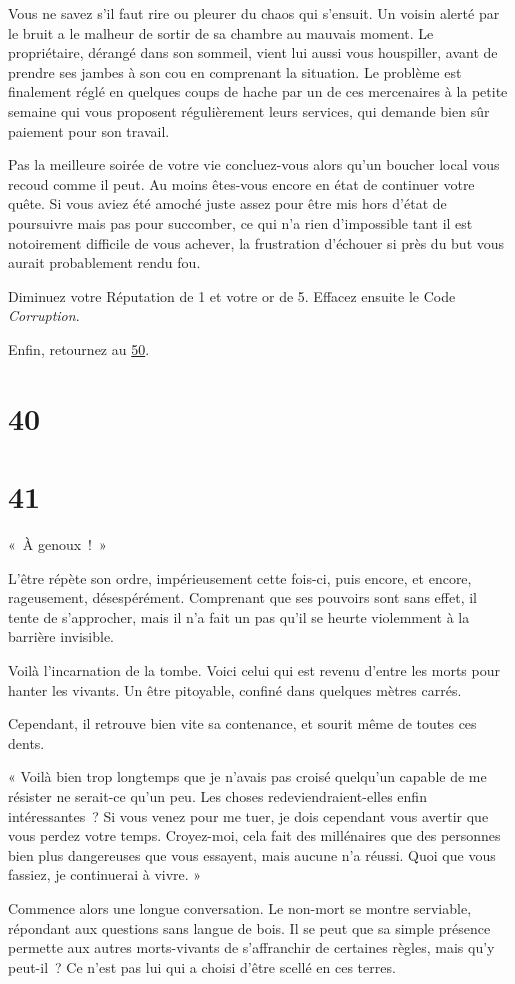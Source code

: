 \documentclass{report}
\newcommand{\gsection}[1]{
    \section{#1}
    \label{section-#1}
}
\newcommand{\glink}[1]{\hyperref[section-#1]{#1}}
\begin{document}
Vous ne savez s'il faut rire ou pleurer du chaos qui s'ensuit. Un voisin alerté par le bruit a le malheur de sortir de sa chambre au mauvais moment. Le propriétaire, dérangé dans son sommeil, vient lui aussi vous houspiller, avant de prendre ses jambes à son cou en comprenant la situation. Le problème est finalement réglé en quelques coups de hache par un de ces mercenaires à la petite semaine qui vous proposent régulièrement leurs services, qui demande bien sûr paiement pour son travail.

Pas la meilleure soirée de votre vie concluez-vous alors qu'un boucher local vous recoud comme il peut. Au moins êtes-vous encore en état de continuer votre quête. Si vous aviez été amoché juste assez pour être mis hors d'état de poursuivre mais pas pour succomber, ce qui n'a rien d'impossible tant il est notoirement difficile de vous achever, la frustration d'échouer si près du but vous aurait probablement rendu fou.

Diminuez votre Réputation de 1 et votre or de 5. Effacez ensuite le Code \emph{Corruption}.

Enfin, retournez au \glink{50}.

\gsection{40}

\gsection{41}

« À genoux ! »

L'être répète son ordre, impérieusement cette fois-ci, puis encore, et encore, rageusement, désespérément. Comprenant que ses pouvoirs sont sans effet, il tente de s'approcher, mais il n'a fait un pas qu'il se heurte violemment à la barrière invisible.

Voilà l'incarnation de la tombe. Voici celui qui est revenu d'entre les morts pour hanter les vivants. Un être pitoyable, confiné dans quelques mètres carrés.

Cependant, il retrouve bien vite sa contenance, et sourit même de toutes ces dents.

« Voilà bien trop longtemps que je n'avais pas croisé quelqu'un capable de me résister ne serait-ce qu'un peu. Les choses redeviendraient-elles enfin intéressantes ? Si vous venez pour me tuer, je dois cependant vous avertir que vous perdez votre temps. Croyez-moi, cela fait des millénaires que des personnes bien plus dangereuses que vous essayent, mais aucune n'a réussi. Quoi que vous fassiez, je continuerai à vivre. »

Commence alors une longue conversation. Le non-mort se montre serviable, répondant aux questions sans langue de bois. Il se peut que sa simple présence permette aux autres morts-vivants de s'affranchir de certaines règles, mais qu'y peut-il ? Ce n'est pas lui qui a choisi d'être scellé en ces terres.
\end{document}
